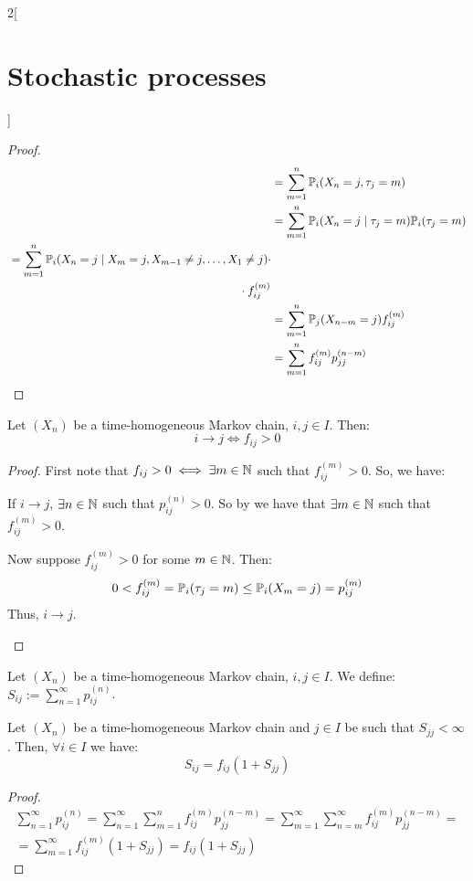 \documentclass[../../../main_math.tex]{subfiles}
\begin{document}
\begin{multicols}{2}[\section{Stochastic processes}]
\begin{proof}
\begin{align*}
                   & =\sum_{m=1}^n \Prob_i(X_n=j,\tau_j=m)                        \\
                   & =\sum_{m=1}^n \Prob_i(X_n=j\mid\tau_j=m)\Prob_i(\tau_j=m)    \\
      \begin{split}
        & =\sum_{m=1}^n \Prob_i(X_n=j\mid X_m=j,X_{m-1}\ne j,\ldots, X_1\ne j)\cdot \\
        &\hspace{7cm}\cdot f_{ij}^{(m)}
      \end{split} \\
                   & =\sum_{m=1}^n \Prob_j(X_{n-m}=j)f_{ij}^{(m)}                 \\
                   & =\sum_{m=1}^nf_{ij}^{(m)}p_{jj}^{(n-m)}
    \end{align*}
  \end{proof}
  \begin{proposition}
    Let $(X_n)$ be a time-homogeneous Markov chain, $i, j\in I$. Then:
    $$
      i\to j\iff f_{ij}>0
    $$
  \end{proposition}
  \begin{proof}
    First note that $f_{ij}>0\iff \exists m\in\mathbb{N}$ such that $f_{ij}^{(m)}>0$. So, we have:
    \begin{itemizeiff}
      If $i\to j$, $\exists n\in\mathbb{N}$ such that $p_{ij}^{(n)}>0$. So by  we have that $ \exists m\in\mathbb{N}$ such that $f_{ij}^{(m)}>0$.
      \item Now suppose $f_{ij}^{(m)}>0$ for some $m\in\mathbb{N}$. Then:
      $$
        0<f_{ij}^{(m)}=\mathbb{P}_i(\tau_j=m)\leq \mathbb{P}_i(X_m=j)=p_{ij}^{(m)}
      $$
      Thus, $i\to j$.
    \end{itemizeiff}
  \end{proof}
  \begin{definition}
    Let $(X_n)$ be a time-homogeneous Markov chain, $i, j\in I$. We define: $S_{ij}:=\sum_{n=1}^{\infty}p_{ij}^{(n)}$.
  \end{definition}
  \begin{lemma}\label{SP:lemaPrerec}
    Let $(X_n)$ be a time-homogeneous Markov chain and $j\in I$ be such that $S_{jj}<\infty$. Then, $\forall i\in I$ we have:
    $$
      S_{ij}=f_{ij}(1+S_{jj})
    $$
  \end{lemma}
  \begin{proof}
    \begin{multline*}
      \sum_{n=1}^\infty p_{ij}^{(n)}= \sum_{n=1}^\infty \sum_{m=1}^n f_{ij}^{(m)}p_{jj}^{(n-m)}=\sum_{m=1}^\infty \sum_{n=m}^\infty f_{ij}^{(m)}p_{jj}^{(n-m)}=\\=\sum_{m=1}^\infty f_{ij}^{(m)}(1+S_{jj})=f_{ij}(1+S_{jj})

\end{multline*}
\end{proof}
\end{multicols}
\end{document}
